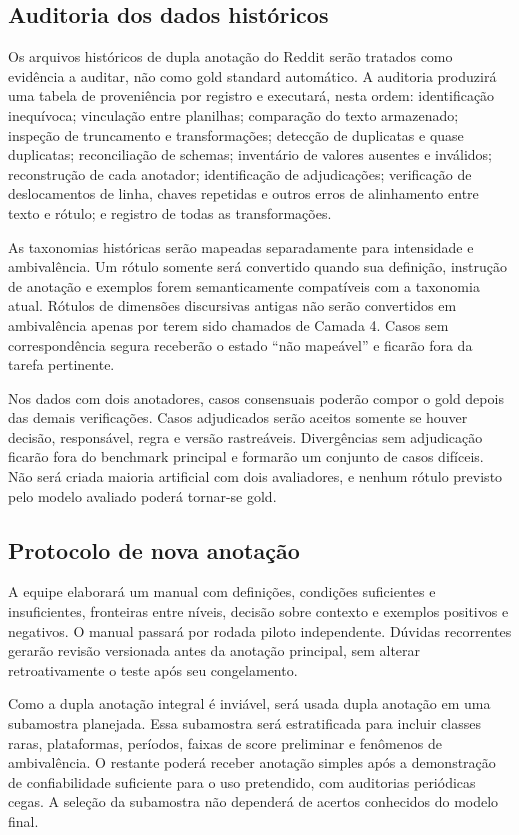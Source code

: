 \subsection{Auditoria dos dados históricos}

Os arquivos históricos de dupla anotação do Reddit serão tratados como evidência a auditar, não como gold standard automático. A auditoria produzirá uma tabela de proveniência por registro e executará, nesta ordem: identificação inequívoca; vinculação entre planilhas; comparação do texto armazenado; inspeção de truncamento e transformações; detecção de duplicatas e quase duplicatas; reconciliação de schemas; inventário de valores ausentes e inválidos; reconstrução de cada anotador; identificação de adjudicações; verificação de deslocamentos de linha, chaves repetidas e outros erros de alinhamento entre texto e rótulo; e registro de todas as transformações.

As taxonomias históricas serão mapeadas separadamente para intensidade e ambivalência. Um rótulo somente será convertido quando sua definição, instrução de anotação e exemplos forem semanticamente compatíveis com a taxonomia atual. Rótulos de dimensões discursivas antigas não serão convertidos em ambivalência apenas por terem sido chamados de Camada 4. Casos sem correspondência segura receberão o estado ``não mapeável'' e ficarão fora da tarefa pertinente.

Nos dados com dois anotadores, casos consensuais poderão compor o gold depois das demais verificações. Casos adjudicados serão aceitos somente se houver decisão, responsável, regra e versão rastreáveis. Divergências sem adjudicação ficarão fora do benchmark principal e formarão um conjunto de casos difíceis. Não será criada maioria artificial com dois avaliadores, e nenhum rótulo previsto pelo modelo avaliado poderá tornar-se gold.

\subsection{Protocolo de nova anotação}

A equipe elaborará um manual com definições, condições suficientes e insuficientes, fronteiras entre níveis, decisão sobre contexto e exemplos positivos e negativos. O manual passará por rodada piloto independente. Dúvidas recorrentes gerarão revisão versionada antes da anotação principal, sem alterar retroativamente o teste após seu congelamento.

Como a dupla anotação integral é inviável, será usada dupla anotação em uma subamostra planejada. Essa subamostra será estratificada para incluir classes raras, plataformas, períodos, faixas de score preliminar e fenômenos de ambivalência. O restante poderá receber anotação simples após a demonstração de confiabilidade suficiente para o uso pretendido, com auditorias periódicas cegas. A seleção da subamostra não dependerá de acertos conhecidos do modelo final.

